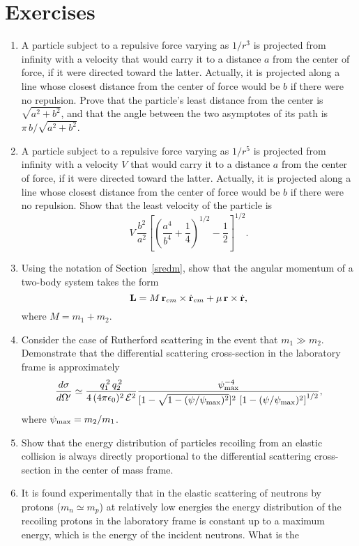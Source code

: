 \section{Exercises}
{\small
\renewcommand{\theenumi}{6.\arabic{enumi}}
\begin{enumerate}
\item A particle subject to a repulsive force varying as $1/r^3$ is projected from infinity with a velocity
that would carry it to a distance $a$ from the center of force, if it were directed toward the latter. Actually, it
is projected along a line whose closest distance from the center of force would be $b$ if there were no repulsion. Prove that the
particle's least distance from
the center is $\sqrt{a^2+b^2}$, and that the angle between the two asymptotes of its path
is $\pi\,b/\sqrt{a^2+b^2}$. 
\item A particle subject to a repulsive force varying as $1/r^5$ is projected from infinity with a velocity $V$ that
would carry it to a distance $a$ from the center of force, if it were directed toward the latter. Actually, it
is projected along a line whose closest distance from the center of force would be $b$ if there were no repulsion. 
Show that the least velocity of the particle is
$$
V\,\frac{b^2}{a^2}\left[\left(\frac{a^4}{b^4}+\frac{1}{4}\right)^{1/2}-\frac{1}{2}\right]^{1/2}.
$$
\item  Using the notation of Section~\ref{sredm}, show that
the angular momentum of a  two-body system takes the
form
$$
{\bf L} = M\,{\bf r}_{cm}\times \dot{\bf r}_{cm} + \mu\,{\bf r}\times \dot{\bf r},
$$
where $M=m_1+m_2$.
\item Consider the case of Rutherford scattering in the event that $m_1\gg m_2$. Demonstrate that the differential scattering cross-section in the
laboratory frame is approximately
$$
\frac{d\sigma}{d\Omega'}\simeq \frac{q_1^{\,2}\,q_2^{\,2}}{4\,(4\pi\epsilon_0)^2\,{\cal E}^2}\frac{\psi_{\rm max}^{-4}}{[1-\sqrt{1-(\psi/\psi_{\rm max})^2}]^2\,\left[1-(\psi/\psi_{\rm max})^2\right]^{1/2}},
$$
where $\psi_{\rm max}=m_2/m_1$.
 \item Show that the energy distribution of particles recoiling from an elastic
collision is always directly proportional to the differential scattering cross-section
in the center of mass frame.
\item It is found experimentally that in the elastic scattering of neutrons
by protons ($m_n\simeq m_p$) at relatively low energies the energy distribution
of the recoiling protons in the laboratory frame is constant up to
a maximum energy, which is the energy of the incident neutrons. What is the

\end{enumerate}}
